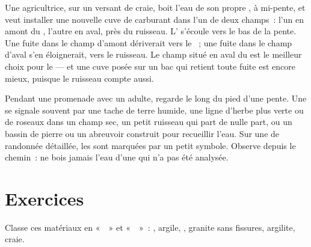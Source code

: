 \begin{example}\label{ex:g6:water-underground:tank}
Une agricultrice, sur un versant de craie, boit l'eau de son propre ,
à mi-pente, et veut installer une nouvelle cuve de carburant dans l'un de
deux champs~: l'un en amont du , l'autre en aval, près du ruisseau.
L' s'écoule vers le bas de la pente. Une fuite dans le champ
d'amont dériverait vers le ~; une fuite dans le champ d'aval s'en
éloignerait, vers le ruisseau. Le champ situé en aval du  est le
meilleur choix pour le  --- et une cuve posée sur un bac qui retient
toute fuite est encore mieux, puisque le ruisseau compte aussi.
\end{example}

\begin{inthefield}
Pendant une promenade avec un adulte, regarde le long du pied d'une pente.
Une  se signale souvent par une tache de terre humide, une ligne
d'herbe plus verte ou de roseaux dans un champ sec, un petit ruisseau qui
part de nulle part, ou un bassin de pierre ou un abreuvoir construit pour
recueillir l'eau. Sur une  de randonnée détaillée, les  sont
marquées par un petit symbole. Observe depuis le chemin~: ne bois jamais
l'eau d'une  qui n'a pas été analysée.
\end{inthefield}

\section{Exercices}

\begin{exercise}[$\star$]\label{exo:g6:water-underground:1}
Classe ces matériaux en «~~» et «~~»~: ,
argile, , granite sans fissures, argilite, craie.
\end{exercise}


